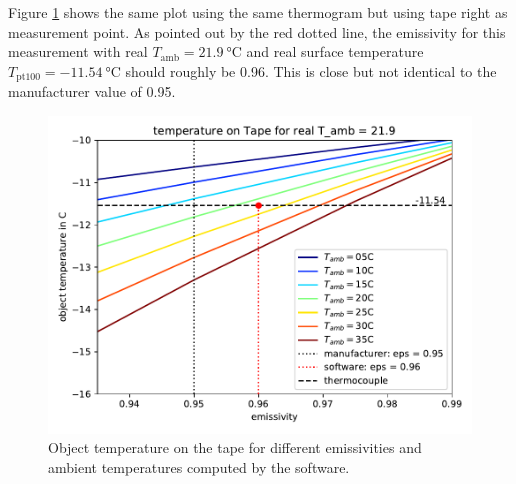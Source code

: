 Figure \ref{fig:softwareTape} shows the same plot using the same thermogram but using tape right as measurement point. As pointed out by the red dotted line, the emissivity for this measurement with real $T_\text{amb}=\SI{21.9}{\degreeCelsius}$ and real surface temperature $T_\text{pt100} = \SI{-11.54}{\degreeCelsius}$ should roughly be \SI{0.96}{}. This is close but not identical to the manufacturer value of \SI{0.95}{}.
\begin{figure}[h!]
	\centering
	\includegraphics[width=.8\textwidth]{img/softwareTape.pdf}
	\caption{Object temperature on the tape for different emissivities and ambient temperatures computed by the software.}
	\label{fig:softwareTape}
\end{figure} \\


